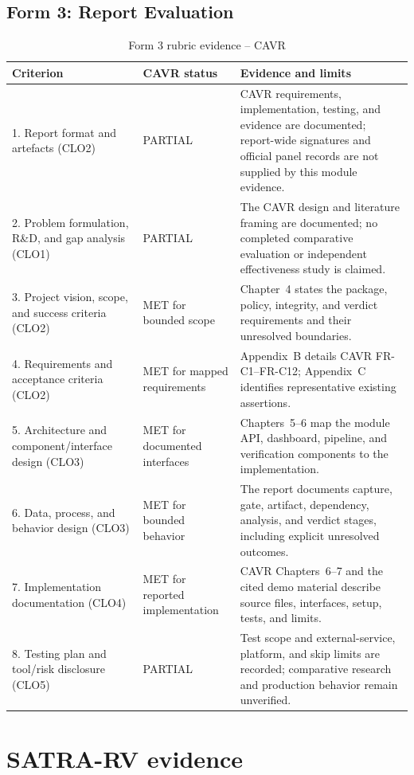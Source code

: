 \subsection{Form 3: Report Evaluation}
\small
\begin{longtable}{p{}p{}p{}}
\caption{Form 3 rubric evidence -- CAVR}\\
\toprule
\textbf{Criterion} & \textbf{CAVR status} & \textbf{Evidence and limits}\\
\midrule
1. Report format and artefacts (CLO2) & PARTIAL & CAVR requirements, implementation, testing, and evidence are documented; report-wide signatures and official panel records are not supplied by this module evidence.\\
2. Problem formulation, R\&D, and gap analysis (CLO1) & PARTIAL & The CAVR design and literature framing are documented; no completed comparative evaluation or independent effectiveness study is claimed.\\
3. Project vision, scope, and success criteria (CLO2) & MET for bounded scope & Chapter~4 states the package, policy, integrity, and verdict requirements and their unresolved boundaries.\\
4. Requirements and acceptance criteria (CLO2) & MET for mapped requirements & Appendix~B details CAVR FR-C1--FR-C12; Appendix~C identifies representative existing assertions.\\
5. Architecture and component/interface design (CLO3) & MET for documented interfaces & Chapters~5--6 map the module API, dashboard, pipeline, and verification components to the implementation.\\
6. Data, process, and behavior design (CLO3) & MET for bounded behavior & The report documents capture, gate, artifact, dependency, analysis, and verdict stages, including explicit unresolved outcomes.\\
7. Implementation documentation (CLO4) & MET for reported implementation & CAVR Chapters~6--7 and the cited demo material describe source files, interfaces, setup, tests, and limits.\\
8. Testing plan and tool/risk disclosure (CLO5) & PARTIAL & Test scope and external-service, platform, and skip limits are recorded; comparative research and production behavior remain unverified.\\
\bottomrule
\end{longtable}
\normalsize

\section{SATRA-RV evidence}
